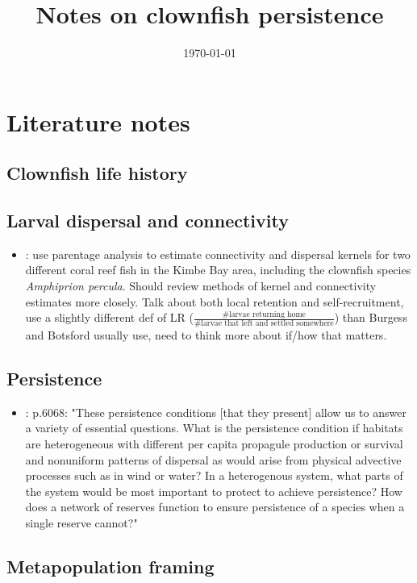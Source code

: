 \documentclass[12pt, oneside]{article}   	%
\title{Notes on clownfish persistence}
\begin{document}
\date{\today}
\maketitle{}
\section*{Literature notes}
\subsection*{Clownfish life history}
\subsection*{Larval dispersal and connectivity}
\begin{itemize}
\item \citep{almany2017larval}: use parentage analysis to estimate connectivity and dispersal kernels for two different coral reef fish in the Kimbe Bay area, including the clownfish species \textit{Amphiprion percula}. Should review methods of kernel and connectivity estimates more closely. Talk about both local retention and self-recruitment, use a slightly different def of LR ($\frac{\text{\# larvae returning home}}{\text{\# larvae that left and settled somewhere}}$) than Burgess and Botsford usually use, need to think more about if/how that matters.
\end{itemize}
\subsection*{Persistence}
\begin{itemize}
\item \citep{hastings_persistence_2006}: p.6068: "These persistence conditions [that they present] allow us to answer a variety of essential questions. What is the persistence condition if habitats are heterogeneous with different per capita propagule production or survival and nonuniform patterns of dispersal as would arise from physical advective processes such as in wind or water? In a heterogenous system, what parts of the system would be most important to protect to achieve persistence? How does a network of reserves function to ensure persistence of a species when a single reserve cannot?"
\end{itemize}
\subsection*{Metapopulation framing}
\end{document}
